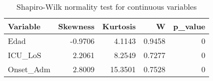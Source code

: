 \begin{table}

\caption{Shapiro-Wilk normality test for continuous variables}
\centering
\begin{tabular}[t]{l|r|r|r|r}
\hline
Variable & Skewness & Kurtosis & W & p\_value\\
\hline
Edad & -0.9706 & 4.1143 & 0.9458 & 0\\
\hline
ICU\_LoS & 2.2061 & 8.2549 & 0.7277 & 0\\
\hline
Onset\_Adm & 2.8009 & 15.3501 & 0.7528 & 0\\
\hline
\end{tabular}
\end{table}
